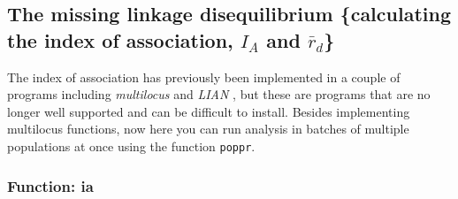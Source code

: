 \documentclass[letterpaper]{article}
\newcommand{\tab}{\hspace*{1em}}
\begin{document}
\subsection{The missing linkage disequilibrium \{calculating the index of association, $I_A$ and $\bar r_d$\}}

\tab\tab The index of association has previously been implemented in a couple of programs including \textit{multilocus} \cite{Agapow:2001} and \textit{LIAN} \cite{Haubold:2000}, but these are programs that are no longer well supported and can be difficult to install. Besides implementing multilocus functions, now here you can run analysis in batches of multiple populations at once using the function \texttt{poppr}.
\subsubsection{Function: ia}
\end{document}
